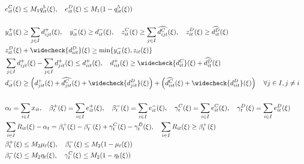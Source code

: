 \documentclass[10pt]{article}
\begin{document}
\begin{align*}
    &e^{C}_{it}(\xi) \leq M_1 q^5_{it}(\xi), \quad e^{D}_{it}(\xi) \leq M_1 (1 - q^5_{it}(\xi)) &\\
    &&\\
    &y^+_{it}(\xi) \geq \sum_{j \in I}d^+_{ijt}(\xi), \quad y^-_{it}(\xi) \geq d^-_{it}(\xi), \quad z^C_{it}(\xi) \geq \sum_{j \in I}\widehat{d^{C}_{ijt}}(\xi), \quad z^D_{it}(\xi) \geq \widehat{d^{D}_{it}}(\xi)&\\
    &z^D_{it}(\xi) + \widecheck{d^{D}_{iit}}(\xi) \geq \text{min} \{y^-_{it}(\xi), z_{it}(\xi) \} &\\
    &\sum_{j \in I}d^+_{ijt}(\xi) - \sum_{j \in I}d^+_{jit}(\xi) \leq d^+_{iit}(\xi), \quad d^+_{iit}(\xi) \geq \widecheck{d^{C}_{it}}(\xi) + \widehat{d^{D}_{it}}(\xi) &\\
    &d^-_{it}(\xi) \geq \left( d^+_{jit}(\xi) + \widehat{d^{C}_{jit}}(\xi) + \widecheck{d^{D}_{jit}}(\xi)\right) + \left( \widehat{d^{C}_{iit}}(\xi) + \widecheck{d^{D}_{iit}}(\xi) \right) \quad \forall j \in I, j \neq i &\\
    &&\\
    &\alpha_t = \sum_{i\in I}x_{it}, \quad \beta_t^+(\xi) = \sum_{i\in I}e^+_{it}(\xi), \quad \beta_t^-(\xi) = \sum_{i\in I}e^-_{it}(\xi), \quad \gamma^C_t(\xi) = \sum_{i\in I}e^C_{it}(\xi), \quad \gamma^D_t(\xi) = \sum_{i\in I}e^D_{it}(\xi)&\\
    &\sum_{i \in I} R_{it}(\xi) - \alpha_t = \beta^+_t(\xi) - \beta^-_t(\xi) + \gamma^C_{t}(\xi) - \gamma^D_{t}(\xi), \quad \sum_{i\in I}R_{it}(\xi) \geq \beta_{t}^{+}(\xi)&\\ 
    &\beta^+_t(\xi) \le M_2 \mu_t(\xi), \quad \beta^-_t(\xi) \le M_2 (1 - \mu_t(\xi)) &\\
    &\beta^-_t(\xi) \le M_2 \eta_t(\xi), \quad \gamma^C_t(\xi) \le M_2 (1 - \eta_t(\xi)) &
\end{align*}

\newpage
\end{document}

